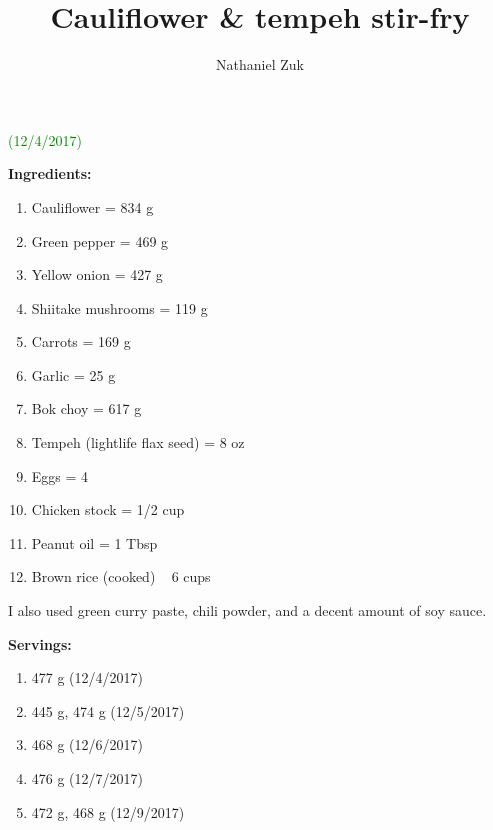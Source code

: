 \usepackage{parskip}
\usepackage{color}

\title{Cauliflower & tempeh stir-fry}
\author{Nathaniel Zuk}


\maketitle

\textcolor{green}{(12/4/2017)}

\textbf{Ingredients:}

\begin{enumerate}
\item Cauliflower = 834 g
\item Green pepper = 469 g
\item Yellow onion = 427 g
\item Shiitake mushrooms = 119 g
\item Carrots = 169 g
\item Garlic = 25 g
\item Bok choy = 617 g
\item Tempeh (lightlife flax seed) = 8 oz
\item Eggs = 4
\item Chicken stock = 1/2 cup
\item Peanut oil = 1 Tbsp
\item Brown rice (cooked) ~ 6 cups
\end{enumerate}

I also used green curry paste, chili powder, and a decent amount of soy sauce.

\textbf{Servings:}
\begin{enumerate}
\item 477 g (12/4/2017)
\item 445 g, 474 g (12/5/2017)
\item 468 g (12/6/2017)
\item 476 g (12/7/2017)
\item 472 g, 468 g (12/9/2017)
\end{enumerate}

